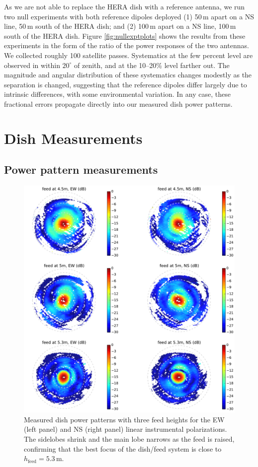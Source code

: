 \documentclass{emulateapj}
\begin{document}
As we are not able to replace the HERA dish with a reference antenna, we run two null experiments with both reference dipoles deployed (1) 50\,m apart on a NS line, 50\,m south of the HERA dish; and (2) 100\,m apart on a NS line, 100\,m south of the HERA dish. Figure \ref{fig:nullexptplots} shows the results from these experiments in the form of the ratio of the power responses of the two antennas. We collected roughly 100 satellite passes. Systematics at the few percent level are observed in  within $20^\circ$ of zenith, and at the 10--20\% level farther out. The magnitude and angular distribution of these systematics changes modestly as the separation is changed, suggesting that the reference dipoles differ largely due to intrinsic differences, with some environmental variation. In any case, these fractional errors propagate directly into our measured dish power patterns.

\section{Dish Measurements}

\subsection{Power pattern measurements}

\begin{figure}[t]
\centering
\includegraphics[width=6.5in]{measured_beams_and_models_maps.pdf}
\caption{Measured dish power patterns with three feed heights for the EW (left panel) and NS (right panel) linear instrumental polarizations. The sidelobes shrink and the main lobe narrows as the feed is raised, confirming that the best focus of the dish/feed system is close to $h_\text{feed}=5.3$\,m.}
\label{fig:measuredbeammaps}
\end{figure}
\end{document}
